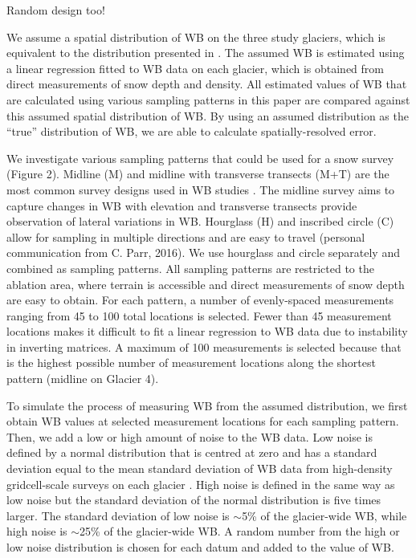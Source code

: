 \documentclass[twocolumn,letterpaper]{igs}
\begin{document}
Random design too!

We assume a spatial distribution of WB on the three study glaciers, which is equivalent to the distribution presented in \cite{Pulwicki2017}. The assumed WB is estimated using a linear regression fitted to WB data on each glacier, which is obtained from direct measurements of snow depth and density. All estimated values of WB that are calculated using various sampling patterns in this paper are compared against this assumed spatial distribution of WB. By using an assumed distribution as the ``true'' distribution of WB, we are able to calculate spatially-resolved error.  

We investigate various sampling patterns that could be used for a snow survey (Figure 2). Midline (M) and midline with transverse transects (M+T) are the most common survey designs used in WB studies \citep[e.g.][]{Kaser2002,Machguth2006}. The midline survey aims to capture changes in WB with elevation and transverse transects provide observation of lateral variations in WB. Hourglass (H) and inscribed circle (C) allow for sampling in multiple directions and are easy to travel (personal communication from C. Parr, 2016). We use hourglass and circle separately and combined as sampling patterns. All sampling patterns are restricted to the ablation area, where terrain is accessible and direct measurements of snow depth are easy to obtain. For each pattern, a number of evenly-spaced measurements ranging from 45 to 100 total locations is selected. Fewer than 45 measurement locations makes it difficult to fit a linear regression to WB data due to instability in inverting matrices. A maximum of 100 measurements is selected because that is the highest possible number of measurement locations along the shortest pattern (midline on Glacier 4). 

To simulate the process of measuring WB from the assumed distribution, we first obtain WB values at selected measurement locations for each sampling pattern. Then, we add a low or high amount of noise to the WB data. Low noise is defined by a normal distribution that is centred at zero and has a standard deviation equal to the mean standard deviation of WB data from high-density gridcell-scale surveys on each glacier \citep[see][for details]{Pulwicki2017}. High noise is defined in the same way as low noise but the standard deviation of the normal distribution is five times larger. The standard deviation of low noise is $\sim$5\% of the glacier-wide WB, while high noise is $\sim$25\% of the glacier-wide WB. A random number from the high or low noise distribution is chosen for each datum and added to the value of WB. 
\end{document}
